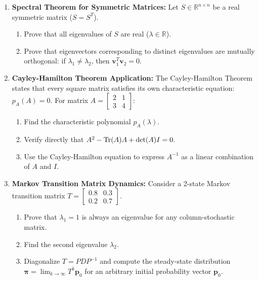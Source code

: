 \begin{enumerate}[label=\textbf{P\arabic*.}]
    \item \textbf{Spectral Theorem for Symmetric Matrices:}
    Let $S \in \mathbb{R}^{n \times n}$ be a real symmetric matrix ($S = S^T$).
    \begin{enumerate}[label=(\alph*)]
        \item Prove that all eigenvalues of $S$ are real ($\lambda \in \mathbb{R}$).
        \item Prove that eigenvectors corresponding to distinct eigenvalues are mutually orthogonal: if $\lambda_1 \ne \lambda_2$, then $\mathbf{v}_1^T \mathbf{v}_2 = 0$.
    \end{enumerate}

    \item \textbf{Cayley-Hamilton Theorem Application:}
    The Cayley-Hamilton Theorem states that every square matrix satisfies its own characteristic equation: $p_A(A) = 0$.
    For matrix $A = \begin{bmatrix} 2 & 1 \\ 3 & 4 \end{bmatrix}$:
    \begin{enumerate}[label=(\alph*)]
        \item Find the characteristic polynomial $p_A(\lambda)$.
        \item Verify directly that $A^2 - \operatorname{Tr}(A)A + \det(A)I = 0$.
        \item Use the Cayley-Hamilton equation to express $A^{-1}$ as a linear combination of $A$ and $I$.
    \end{enumerate}

    \item \textbf{Markov Transition Matrix Dynamics:}
    Consider a 2-state Markov transition matrix $T = \begin{bmatrix} 0.8 & 0.3 \\ 0.2 & 0.7 \end{bmatrix}$.
    \begin{enumerate}[label=(\alph*)]
        \item Prove that $\lambda_1 = 1$ is always an eigenvalue for any column-stochastic matrix.
        \item Find the second eigenvalue $\lambda_2$.
        \item Diagonalize $T = P D P^{-1}$ and compute the steady-state distribution $\boldsymbol{\pi} = \lim_{k \to \infty} T^k \mathbf{p}_0$ for an arbitrary initial probability vector $\mathbf{p}_0$.
    \end{enumerate}


\end{enumerate}
